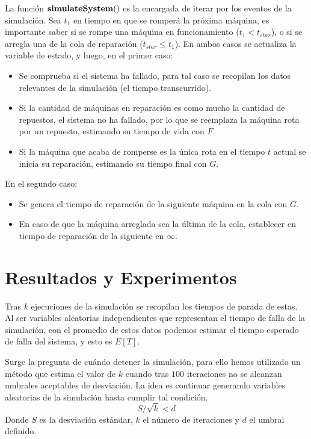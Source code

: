 \documentclass[12pt]{article}
\begin{document}
La función $\bold{simulateSystem()}$ es la encargada de iterar por los eventos de la simulación. Sea $t_1$ en tiempo 
en que se romperá la próxima máquina, es importante saber si se rompe una máquina en funcionamiento ($t_1 < t_{star}$), 
o si se arregla una de la cola de reparación ($t_{star} \leq t_1$). En ambos casos se actualiza la variable de estado,
y luego, en el primer caso:
\begin{itemize}
  \item Se comprueba si el sistema ha fallado, para tal caso se recopilan los datos relevantes de la simulación (el tiempo transcurrido).
  \item Si la cantidad de máquinas en reparación es como mucho la cantidad de repuestos, el sistema no ha fallado, por lo que se reemplaza la máquina rota por un repuesto, estimando su tiempo de vida con $F$.
  \item Si la máquina que acaba de romperse es la única rota en el tiempo $t$ actual se inicia su reparación, estimando su tiempo final con $G$.
\end{itemize}
En el segundo caso:
\begin{itemize}
  \item Se genera el tiempo de reparación de la siguiente máquina en la cola con $G$.
  \item En caso de que la máquina arreglada sea la última de la cola, establecer en tiempo de reparación de la siguiente en $\infty$.
\end{itemize}
\clearpage



\section{Resultados y Experimentos}
Tras $k$ ejecuciones de la simulación se recopilan los tiempos de parada de estas. Al ser variables
aleatorias independientes que representan el tiempo de falla de la simulación, con el promedio de estos 
datos podemos estimar el tiempo esperado de falla del sistema, y esto es $E[T]$.

Surge la pregunta de cuándo detener la simulación, para ello hemos utilizado un método que estima el valor 
de $k$ cuando tras $100$ iteraciones no se alcanzan umbrales aceptables de desviación. La idea es continuar
generando variables aleatorias de la simulación hasta cumplir tal condición.
\[ S/\sqrt{k}<d \]
Donde $S$ es la desviación estándar, $k$ el número de iteraciones y $d$ el umbral definido.
\end{document}
